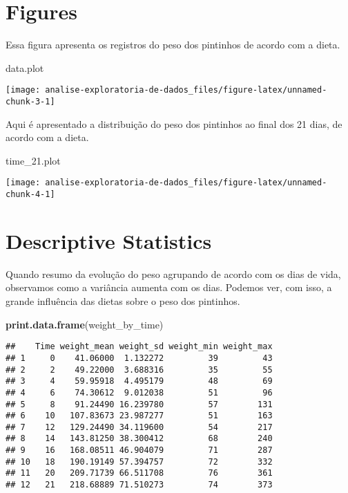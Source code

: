 \documentclass[]{article}
\newenvironment{Shaded}{\begin{snugshade}}{\end{snugshade}}
\newcommand{\KeywordTok}[1]{\textcolor[rgb]{0.13,0.29,0.53}{\textbf{#1}}}
\newcommand{\FloatTok}[1]{\textcolor[rgb]{0.00,0.00,0.81}{#1}}
\newcommand{\NormalTok}[1]{#1}
\begin{document}
\section{Figures}\label{figures}

Essa figura apresenta os registros do peso dos pintinhos de acordo com a
dieta.

\begin{Shaded}
\begin{Highlighting}[]
\NormalTok{data.plot}
\end{Highlighting}
\end{Shaded}

\begin{center}\texttt{[image: analise-exploratoria-de-dados\_files/figure-latex/unnamed-chunk-3-1]} \end{center}

Aqui é apresentado a distribuição do peso dos pintinhos ao final dos 21
dias, de acordo com a dieta.

\begin{Shaded}
\begin{Highlighting}[]
\NormalTok{time_}\FloatTok{21.}\NormalTok{plot}
\end{Highlighting}
\end{Shaded}

\begin{center}\texttt{[image: analise-exploratoria-de-dados\_files/figure-latex/unnamed-chunk-4-1]} \end{center}

\section{Descriptive Statistics}\label{descriptive-statistics}

Quando resumo da evolução do peso agrupando de acordo com os dias de
vida, observamos como a variância aumenta com os dias. Podemos ver, com
isso, a grande influência das dietas sobre o peso dos pintinhos.

\begin{Shaded}
\begin{Highlighting}[]
\KeywordTok{print.data.frame}\NormalTok{(weight_by_time)}
\end{Highlighting}
\end{Shaded}

\begin{verbatim}
##    Time weight_mean weight_sd weight_min weight_max
## 1     0    41.06000  1.132272         39         43
## 2     2    49.22000  3.688316         35         55
## 3     4    59.95918  4.495179         48         69
## 4     6    74.30612  9.012038         51         96
## 5     8    91.24490 16.239780         57        131
## 6    10   107.83673 23.987277         51        163
## 7    12   129.24490 34.119600         54        217
## 8    14   143.81250 38.300412         68        240
## 9    16   168.08511 46.904079         71        287
## 10   18   190.19149 57.394757         72        332
## 11   20   209.71739 66.511708         76        361
## 12   21   218.68889 71.510273         74        373
\end{verbatim}
\end{document}
